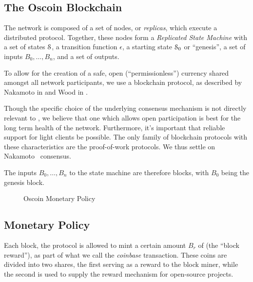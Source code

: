 \subsection{The Oscoin Blockchain}


The \oscoin{} network is composed of a set of nodes, or \emph{replicas}, which
execute a distributed protocol. Together, these nodes form a \emph{Replicated
  State Machine} with a set of states $\mathcal{S}$, a transition function $\epsilon$,
a starting state $\mathcal{S}_0$ or ``genesis'', a set of inputs $B_0, \ldots, B_n$,
and a set of outputs.

To allow for the creation of a safe, open (``permissionless'') currency shared
amongst all network participants, we use a blockchain protocol, as described by
Nakamoto in \cite{bitcoin} and Wood in \cite{ethereum}.

Though the specific choice of the underlying consensus mechanism is not
directly relevant to \oscoin{}, we believe that one which allows open
participation is best for the long term health of the network. Furthermore,
it's important that reliable support for light clients be possible. The only
family of blockchain protocols with these characteristics are the proof-of-work
protocols. We thus settle on Nakamoto~\cite{bitcoin} consensus.

The inputs $B_0, \ldots, B_n$ to the state machine are therefore blocks, with
$B_0$ being the genesis block.


\begin{figure*}[!ht]
    \par\medskip\noindent\minipage{\linewidth}
    \centering
    
    \caption{Oscoin Monetary Policy\label{f:oscoin}}
    \endminipage\par\medskip
\end{figure*}

\subsection{Monetary Policy}

Each block, the protocol is allowed to mint a certain amount $B_r$ of \oscoin{}
(the ``block reward''), as part of what we call the \emph{coinbase}
transaction. These coins are divided into two shares, the first serving as a
reward to the block miner, while the second is used to supply the reward
mechanism for open-source projects.

